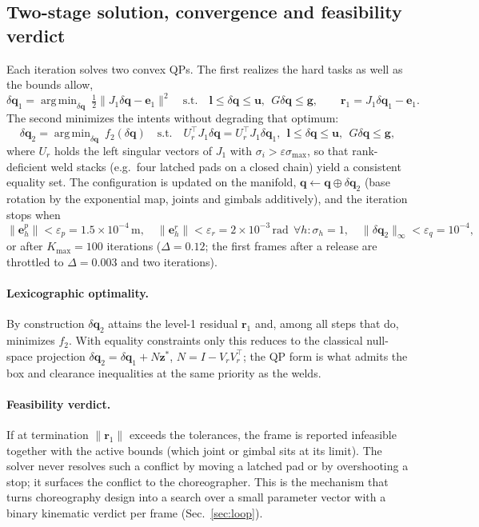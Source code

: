 \documentclass[11pt]{article}
\newcommand{\dq}{\delta\bm q}
\DeclareMathOperator*{\argmin}{arg\,min}
\begin{document}
\subsection{Two-stage solution, convergence and feasibility verdict}

Each iteration solves two convex QPs. The first realizes the hard tasks as
well as the bounds allow,
\begin{equation}
  \dq_1=\argmin_{\dq}\ \tfrac12\|J_1\dq-\bm e_1\|^2
  \quad\text{s.t.}\quad \bm l\le\dq\le\bm u,\ \ G\dq\le\bm g,
  \qquad \bm r_1=J_1\dq_1-\bm e_1 .
  \label{eq:qp1}
\end{equation}
The second minimizes the intents without degrading that optimum:
\begin{equation}
  \dq_2=\argmin_{\dq}\ f_2(\dq)
  \quad\text{s.t.}\quad U_r^\top J_1\dq=U_r^\top J_1\dq_1,\ \
  \bm l\le\dq\le\bm u,\ \ G\dq\le\bm g,
  \label{eq:qp2}
\end{equation}
where $U_r$ holds the left singular vectors of $J_1$ with
$\sigma_i>\varepsilon\sigma_{\max}$, so that rank-deficient weld stacks
(e.g.\ four latched pads on a closed chain) yield a consistent equality set.
The configuration is updated on the manifold,
$\bm q\leftarrow\bm q\oplus\dq_2$ (base rotation by the exponential map,
joints and gimbals additively), and the iteration stops when
\begin{equation}
  \|\bm e^p_h\|<\varepsilon_p=1.5\times10^{-4}\,\mathrm m,\quad
  \|\bm e^r_h\|<\varepsilon_r=2\times10^{-3}\,\mathrm{rad}\ \ \forall h:\sigma_h=1,\quad
  \|\dq_2\|_\infty<\varepsilon_q=10^{-4},
\end{equation}
or after $K_{\max}=100$ iterations ($\Delta=0.12$; the first frames after a
release are throttled to $\Delta=0.003$ and two iterations).

\paragraph{Lexicographic optimality.} By construction $\dq_2$ attains the
level-1 residual $\bm r_1$ and, among all steps that do, minimizes $f_2$.
With equality constraints only this reduces to the classical null-space
projection $\dq_2=\dq_1+N\bm z^*$, $N=I-V_rV_r^\top$; the QP form is what
admits the box and clearance inequalities at the same priority as the welds.

\paragraph{Feasibility verdict.} If at termination
$\|\bm r_1\|$ exceeds the tolerances, the frame is reported infeasible
together with the active bounds (which joint or gimbal sits at its limit).
The solver never resolves such a conflict by moving a latched pad or by
overshooting a stop; it surfaces the conflict to the choreographer. This is
the mechanism that turns choreography design into a search over a small
parameter vector with a binary kinematic verdict per frame
(Sec.~\ref{sec:loop}).
\end{document}
